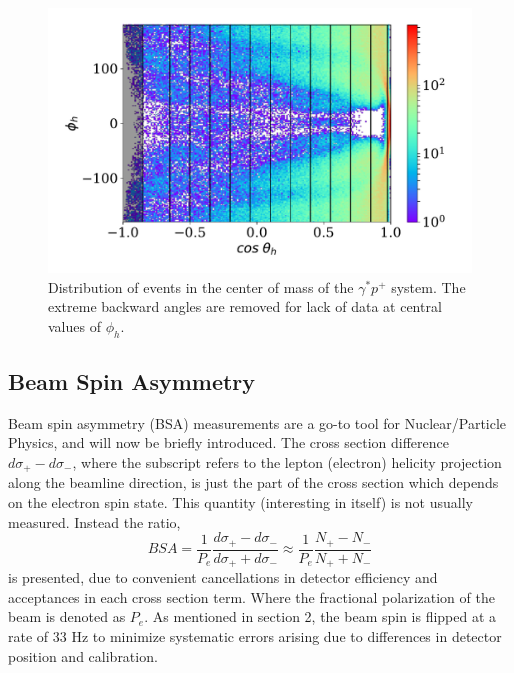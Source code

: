 \begin{figure}
  \begin{center}
    \includegraphics[width=\columnwidth]{image/cos_theta_h_phi_h_binned.pdf}
    \caption{Distribution of events in the center of mass of the $\gamma^* p^+$ system.  The extreme backward angles are removed for lack of data at central values of $\phi_h$.}
  \end{center}
\end{figure}

\subsection{Beam Spin Asymmetry}
Beam spin asymmetry (BSA) measurements are a go-to tool for Nuclear/Particle Physics, and will now be briefly introduced.  The cross section difference $d\sigma_{+} - d\sigma_{-}$, where the subscript refers to the lepton (electron) helicity projection along the beamline direction, is just the part of the cross section which depends on the electron spin state.  This quantity (interesting in itself) is not usually measured.  Instead the ratio,
\begin{equation}
	BSA = \frac{1}{P_e} \frac{d\sigma_{+} - d\sigma_{-}}{d\sigma_{+} + d\sigma_{-}} \approx \frac{1}{P_e} \frac{N_+ - N_-}{N_+ + N_-}
\end{equation}    
is presented, due to convenient cancellations in detector efficiency and acceptances in each cross section term.  Where the fractional polarization of the beam is denoted as $P_e$.  As mentioned in section 2, the beam spin is flipped at a rate of 33 Hz to minimize systematic errors arising due to differences in detector position and calibration.  
\\

